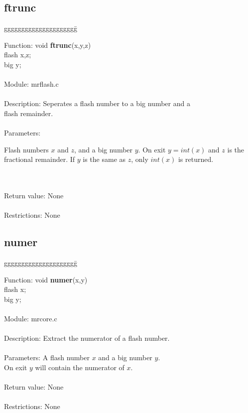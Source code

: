 \subsection{ftrunc}

\begin{tabbing}
ggggggggggggggggggggg\= \kill

      Function:      \>void {\bf ftrunc}(x,y,z) \\
                     \>flash x,z; \\
                     \>big y; \\
      \ \\
      Module:        \>mrflash.c \\
      \ \\
      Description:   \>Seperates a flash number to a big number and a  \\
                     \>flash remainder. \\
      \ \\
      Parameters:    \>
                     \parbox[t]{3in}
                     {Flash numbers $x$ and $z$, and a big number $y$. 
                     On exit $y=int(x)$ and $z$ is the fractional remainder.
                     If $y$ is the same as $z$, only $int(x)$ is returned.}\\ 
      \ \\
      Return value:  \>None \\
      \ \\
      Restrictions:  \>None \\
      
\end{tabbing}
\pagebreak
\subsection{numer}

\begin{tabbing}
ggggggggggggggggggggg\= \kill

      Function:      \>void {\bf numer}(x,y) \\
                     \>flash x; \\
                     \>big y; \\
      \ \\
      Module:        \>mrcore.c \\
      \ \\
      Description:   \>Extract the numerator of a flash number. \\
      \ \\
      Parameters:    \>A flash number $x$ and a big number $y$. \\
                     \>On exit $y$ will contain the numerator of $x$. \\
      \ \\
      Return value:  \>None \\
      \ \\
      Restrictions:  \>None \\

\end{tabbing}
